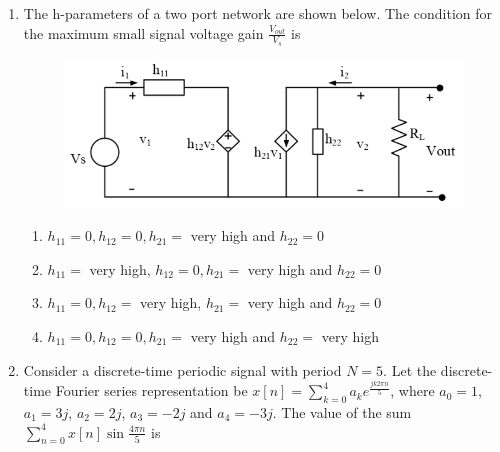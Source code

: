 \documentclass[a4paper, 11pt]{article}
\begin{document}
\begin{enumerate}
    \begin{enumerate}
    \end{enumerate}

    \hfill{}
    
    \item The h-parameters of a two port network are shown below. The condition for the maximum small signal voltage gain $\frac{V_{out}}{V_s}$ is
    \begin{figure}[H]
        \centering
        \includegraphics[width=0.7\columnwidth]{figs/Q36.png}
        \caption*{}
        \label{fig:q46}
    \end{figure}
    \begin{enumerate}
        \item $h_{11}=0, h_{12}=0, h_{21}=$ very high and $h_{22}=0$
        \item $h_{11}=$ very high, $h_{12}=0, h_{21}=$ very high and $h_{22}=0$
        \item $h_{11}=0, h_{12}=$ very high, $h_{21}=$ very high and $h_{22}=0$
        \item $h_{11}=0, h_{12}=0, h_{21}=$ very high and $h_{22}=$ very high
    \end{enumerate}

    \hfill{}
    
    \item Consider a discrete-time periodic signal with period $N=5$. Let the discrete-time Fourier series  representation be $x[n] = \sum_{k=0}^{4} a_k e^{\frac{jk2\pi n}{5}}$, where $a_0 = 1$, $a_1=3j$, $a_2=2j$, $a_3=-2j$ and $a_4=-3j$. The value of the sum $\sum_{n=0}^{4} x[n] \sin\frac{4\pi n}{5}$ is
    \begin{enumerate}
    \end{enumerate}


\end{enumerate}
\end{document}
